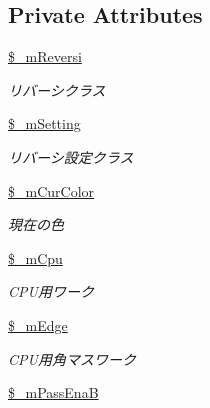 \subsection*{Private Attributes}
\begin{DoxyCompactItemize}
\item 
\hyperlink{class_reversi_play_ab6b142a6d453a963b8c8c9f6829f080a}{\$\+\_\+m\+Reversi}\hypertarget{class_reversi_play_ab6b142a6d453a963b8c8c9f6829f080a}{}\label{class_reversi_play_ab6b142a6d453a963b8c8c9f6829f080a}

\begin{DoxyCompactList}\small\item\em リバーシクラス \end{DoxyCompactList}\item 
\hyperlink{class_reversi_play_a8afaea234500f7e7c8b82ae7074e3453}{\$\+\_\+m\+Setting}\hypertarget{class_reversi_play_a8afaea234500f7e7c8b82ae7074e3453}{}\label{class_reversi_play_a8afaea234500f7e7c8b82ae7074e3453}

\begin{DoxyCompactList}\small\item\em リバーシ設定クラス \end{DoxyCompactList}\item 
\hyperlink{class_reversi_play_addd9335d56d0d7f94c96c0d0243517fa}{\$\+\_\+m\+Cur\+Color}\hypertarget{class_reversi_play_addd9335d56d0d7f94c96c0d0243517fa}{}\label{class_reversi_play_addd9335d56d0d7f94c96c0d0243517fa}

\begin{DoxyCompactList}\small\item\em 現在の色 \end{DoxyCompactList}\item 
\hyperlink{class_reversi_play_a1eaf7e09a3c1797e3a5aa7ffe2fc144f}{\$\+\_\+m\+Cpu}\hypertarget{class_reversi_play_a1eaf7e09a3c1797e3a5aa7ffe2fc144f}{}\label{class_reversi_play_a1eaf7e09a3c1797e3a5aa7ffe2fc144f}

\begin{DoxyCompactList}\small\item\em C\+P\+U用ワーク \end{DoxyCompactList}\item 
\hyperlink{class_reversi_play_ac73d4aea2bec94a73d6096645f3c05f3}{\$\+\_\+m\+Edge}\hypertarget{class_reversi_play_ac73d4aea2bec94a73d6096645f3c05f3}{}\label{class_reversi_play_ac73d4aea2bec94a73d6096645f3c05f3}

\begin{DoxyCompactList}\small\item\em C\+P\+U用角マスワーク \end{DoxyCompactList}\item 
\hyperlink{class_reversi_play_a1a119ab413c1b5c3ac9f644e70af5c88}{\$\+\_\+m\+Pass\+EnaB}\hypertarget{class_reversi_play_a1a119ab413c1b5c3ac9f644e70af5c88}{}\label{class_reversi_play_a1a119ab413c1b5c3ac9f644e70af5c88}


\end{DoxyCompactItemize}
